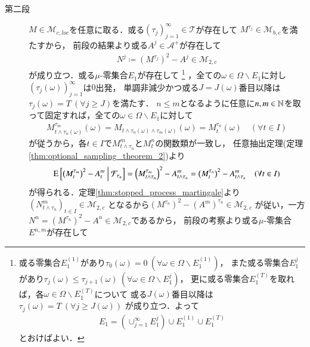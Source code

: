 \begin{prf}
\begin{description}
			\item[第二段]
				$M \in \mathcal{M}_{c,loc}$を任意に取る．或る$(\tau_j)_{j=1}^{\infty} \in \mathcal{T}$が存在して
				$M^{\tau_j} \in \mathcal{M}_{b,c}$を満たすから，
				前段の結果より或る$A^j \in \mathcal{A}^+$が存在して
				\begin{align}
					N^j \coloneqq \left( M^{\tau_j} \right)^2 - A^j \in \mathcal{M}_{2,c}
				\end{align}
				が成り立つ．或る$\mu$-零集合$E_1$が存在して
				\footnote{
					或る零集合$E_1^{(1)}$があり$\tau_0(\omega) = 0\ (\forall \omega \in \Omega \backslash E_1^{(1)})$，
					また或る零集合$E_1^j$があり$\tau_j(\omega) \leq \tau_{j+1}(\omega)\ (\forall \omega \in \Omega \backslash E_1^j)$，
					更に或る零集合$E_1^{(T)}$を取れば，各$\omega \in \Omega \backslash E_1^{(T)}$について
					或る$J(\omega)$番目以降は$\tau_j(\omega) = T\ (\forall j \geq J(\omega))$
					が成り立つ．よって
					\begin{align}
						E_1 = \left( \cup_{j=1}^{\infty} E_1^j \right) \cup E_1^{(1)} \cup E_1^{(T)}
					\end{align}
					とおけばよい．
				}
				，全ての$\omega \in \Omega \backslash E_1$に対し$(\tau_j(\omega))_{j=1}^{\infty}$は$0$出発，
				単調非減少かつ或る$J=J(\omega)$番目以降は$\tau_j(\omega) = T\ (\forall j \geq J)$を満たす．
				$n \leq m$となるように任意に$n,m \in \mathbb{N}$を取って固定すれば，全ての$\omega \in \Omega \backslash E_1$に対して
				\begin{align}
					M_{t \wedge \tau_n(\omega)}^{\tau_m}(\omega) = M_{t \wedge \tau_n(\omega) \wedge \tau_m(\omega)}(\omega) = M_t^{\tau_n}(\omega) 
					\quad (\forall t \in I)
				\end{align}
				が従うから，各$t \in I$で$M_{t \wedge \tau_n}^m$と$M_t^n$の関数類が一致し，
				任意抽出定理(定理\ref{thm:optional_sampling_theorem_2})より
				\begin{align}
					\operatorname{E} \left[ \left(M_t^{\tau_m}\right)^2 - A_t^m \ \middle|\ \mathcal{F}_{\tau_n} \right] 
					= \left(M_{t \wedge \tau_n}^{\tau_m}\right)^2 - A_{t \wedge \tau_n}^m 
					= \left(M_t^{\tau_n}\right)^2 - A_{t \wedge \tau_n}^m
					\quad (\forall t \in I)
				\end{align}
				が得られる．定理\ref{thm:stopped_process_martingale}より
				$\left(N_{t \wedge \tau_n}^m \right)_{t \in I} \in \mathcal{M}_{2,c}$
				となるから$\left(M^{\tau_n}\right)^2 - (A^m)^{\tau_n} \in \mathcal{M}_{2,c}$
				が従い，一方$N^n = \left(M^{\tau_n}\right)^2 - A^n \in \mathcal{M}_{2,c}$であるから，
				前段の考察より或る$\mu$-零集合$E^{n,m}$が存在して

\end{description}
\end{prf}
